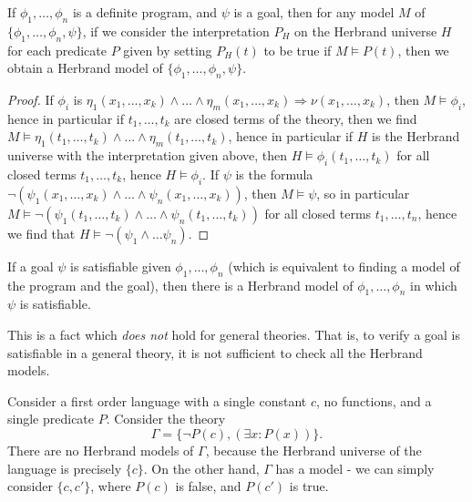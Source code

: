 \begin{theorem}
    If $\phi_1, \dots, \phi_n$ is a definite program, and $\psi$ is a goal, then for any model $M$ of $\{ \phi_1, \dots, \phi_n, \psi \}$, if we consider the interpretation $P_H$ on the Herbrand universe $H$ for each predicate $P$ given by setting $P_H(t)$ to be true if $M \vDash P(t)$, then we obtain a Herbrand model of $\{ \phi_1, \dots, \phi_n, \psi \}$.
\end{theorem}
\begin{proof}
    If $\phi_i$ is $\eta_1(x_1, \dots, x_k) \wedge \dots \wedge \eta_m(x_1, \dots, x_k) \Rightarrow \nu(x_1, \dots, x_k)$, then $M \vDash \phi_i$, hence in particular if $t_1, \dots, t_k$ are closed terms of the theory, then we find $M \vDash \eta_1(t_1, \dots, t_k) \wedge \dots \wedge \eta_m(t_1, \dots, t_k)$, hence in particular if $H$ is the Herbrand universe with the interpretation given above, then $H \vDash \phi_i(t_1, \dots, t_k)$ for all closed terms $t_1, \dots, t_k$, hence $H \vDash \phi_i$. If $\psi$ is the formula $\neg (\psi_1(x_1, \dots, x_k) \wedge \dots \wedge \psi_n(x_1, \dots, x_k))$, then $M \vDash \psi$, so in particular $M \vDash \neg (\psi_1(t_1, \dots, t_k) \wedge \dots \wedge \psi_n(t_1, \dots, t_k))$ for all closed terms $t_1, \dots, t_n$, hence we find that $H \vDash \neg(\psi_1 \wedge \dots \psi_n)$.
\end{proof}

\begin{corollary}
    If a goal $\psi$ is satisfiable given $\phi_1, \dots, \phi_n$ (which is equivalent to finding a model of the program and the goal), then there is a Herbrand model of $\phi_1, \dots, \phi_n$ in which $\psi$ is satisfiable.
\end{corollary}

This is a fact which {\it does not} hold for general theories. That is, to verify a goal is satisfiable in a general theory, it is not sufficient to check all the Herbrand models.

\begin{example}
    Consider a first order language with a single constant $c$, no functions, and a single predicate $P$. Consider the theory
    \[ \Gamma = \{ \neg P(c), (\exists x: P(x)) \}. \]
    There are no Herbrand models of $\Gamma$, because the Herbrand universe of the language is precisely $\{ c \}$. On the other hand, $\Gamma$ has a model - we can simply consider $\{ c, c' \}$, where $P(c)$ is false, and $P(c')$ is true.
\end{example}

